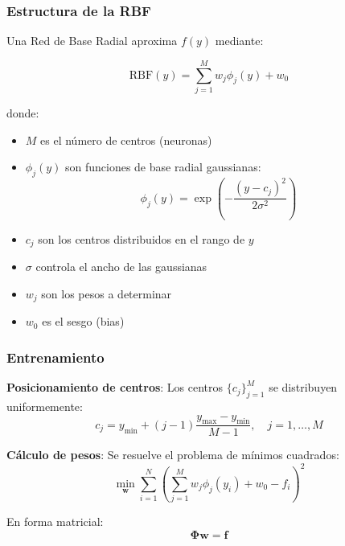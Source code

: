 \documentclass[11pt,a4paper]{article}
\begin{document}
\subsubsection{Estructura de la RBF}

Una Red de Base Radial aproxima $f(y)$ mediante:

\begin{equation}
\text{RBF}(y) = \sum_{j=1}^{M} w_j \phi_j(y) + w_0
\label{eq:rbf_structure}
\end{equation}

donde:
\begin{itemize}
    \item $M$ es el número de centros (neuronas)
    \item $\phi_j(y)$ son funciones de base radial gaussianas:
    \begin{equation}
    \phi_j(y) = \exp\left(-\frac{(y - c_j)^2}{2\sigma^2}\right)
    \label{eq:gaussian_rbf}
    \end{equation}
    \item $c_j$ son los centros distribuidos en el rango de $y$
    \item $\sigma$ controla el ancho de las gaussianas
    \item $w_j$ son los pesos a determinar
    \item $w_0$ es el sesgo (bias)
\end{itemize}

\subsubsection{Entrenamiento}

\textbf{Posicionamiento de centros}: Los centros $\{c_j\}_{j=1}^{M}$ se distribuyen uniformemente:
\begin{equation}
c_j = y_{\min} + (j-1) \frac{y_{\max} - y_{\min}}{M-1}, \quad j = 1, \ldots, M
\end{equation}

\textbf{Cálculo de pesos}: Se resuelve el problema de mínimos cuadrados:
\begin{equation}
\min_{\mathbf{w}} \sum_{i=1}^{N} \left( \sum_{j=1}^{M} w_j \phi_j(y_i) + w_0 - f_i \right)^2
\label{eq:least_squares}
\end{equation}

En forma matricial:
\begin{equation}
\boldsymbol{\Phi} \mathbf{w} = \mathbf{f}
\end{equation}
\end{document}
